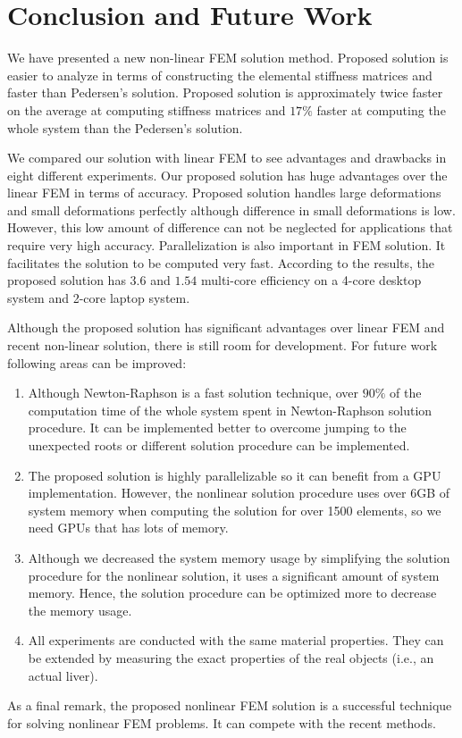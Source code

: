 \chapter{Conclusion and Future Work}
\label{chapter7}

We have presented a new non-linear FEM solution method. Proposed solution is easier to analyze in terms of constructing the elemental stiffness matrices and faster than Pedersen's solution. Proposed solution is approximately twice faster on the average at computing stiffness matrices and $17\%$ faster at computing the whole system than the Pedersen's solution. 

We compared our solution with linear FEM to see advantages and drawbacks in eight different experiments. Our proposed solution has huge advantages over the linear FEM in terms of accuracy. Proposed solution handles large deformations and small deformations perfectly although difference in small deformations is low. However, this low amount of difference can not be neglected for applications that require very high accuracy. Parallelization is also important in FEM solution. It facilitates the solution to be computed very fast. According to the results, the proposed solution has $3.6$ and $1.54$ multi-core efficiency on a 4-core desktop system and 2-core laptop system.

Although the proposed solution has significant advantages over linear FEM and recent non-linear solution, there is still room for development. For future work following areas can be improved:

\begin{enumerate}
\item Although Newton-Raphson is a fast solution technique, over $90\%$ of the computation time of the whole system spent in Newton-Raphson solution procedure. It can be implemented better to overcome jumping to the unexpected roots or different solution procedure can be implemented.
\item The proposed solution is highly parallelizable so it can benefit from a GPU implementation. However, the nonlinear solution procedure uses over 6GB of system memory when computing the solution for over 1500 elements, so we need GPUs that has lots of memory.
\item Although we decreased the system memory usage by simplifying the solution procedure for the nonlinear solution, it uses a significant amount of system memory. Hence, the solution procedure can be optimized more to decrease the memory usage.
\item All experiments are conducted with the same material properties. They can be extended by measuring the exact properties of the  real objects (i.e., an actual liver).
\end{enumerate}

As a final remark, the proposed nonlinear FEM solution is a successful technique for solving nonlinear FEM problems. It can compete with the recent methods. 


